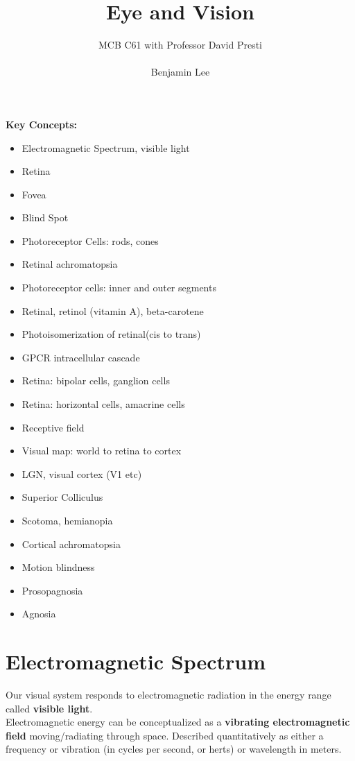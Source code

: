 \documentclass{article}
\title{Eye and Vision}
\author{MCB C61 with Professor David Presti \\ \\ Benjamin Lee}
\begin{document}
\maketitle

\textbf{Key Concepts:}
\begin{itemize}
    \item Electromagnetic Spectrum, visible light
    \item Retina
    \item Fovea
    \item Blind Spot
    \item Photoreceptor Cells: rods, cones
    \item Retinal achromatopsia
    \item Photoreceptor cells: inner and outer segments
    \item Retinal, retinol (vitamin A), beta-carotene
    \item Photoisomerization of retinal(cis to trans) \item GPCR intracellular cascade
    \item Retina: bipolar cells, ganglion cells
    \item Retina: horizontal cells, amacrine cells
    \item Receptive field
    \item Visual map: world to retina to cortex
    \item LGN, visual cortex (V1 etc)
    \item Superior Colliculus
    \item Scotoma, hemianopia
    \item Cortical achromatopsia
    \item Motion blindness 
    \item Prosopagnosia
    \item Agnosia
\end{itemize}

\newpage
\section{Electromagnetic Spectrum}
Our visual system responds to electromagnetic radiation in the energy range called \textbf{visible light}. \\

\noindent Electromagnetic energy can be conceptualized as a \textbf{vibrating electromagnetic field} moving/radiating through space. Described quantitatively as either a frequency or vibration (in cycles per second, or herts) or wavelength in meters. \\
\end{document}
